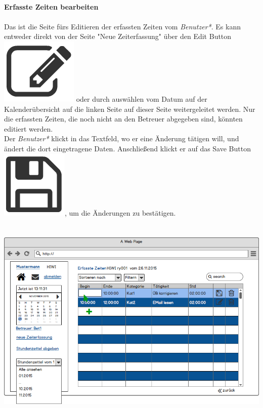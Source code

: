 \newpage
\textbf{\\Erfasste Zeiten bearbeiten}\\
\\
Das ist die Seite fürs Editieren der erfassten Zeiten vom \emph{Benutzer*}.
Es kann entweder direkt von der Seite "Neue Zeiterfassung" über den Edit Button \includegraphics[scale=.2]{UI/Button/Edit.png} oder durch auswählen vom Datum auf der Kalenderübersicht auf die linken Seite auf dieser Seite weitergeleitet werden. Nur die erfassten Zeiten, die noch nicht an den Betreuer abgegeben sind, könnten editiert werden.\\
Der \emph{Benutzer*} klickt in das Textfeld, wo er eine Änderung tätigen will, und ändert die dort eingetragene Daten. Anschließend klickt er auf das Save Button\includegraphics[scale=.2]{UI/Button/Save.png}, um die Änderungen zu bestätigen.\\
\\
\\
\includegraphics[width=\linewidth]{UI/Benutzer/Editieren.png}






